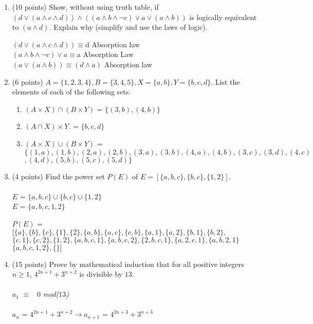 \documentclass[12pt,fleqn]{article}
\begin{document}
\begin{enumerate}
\item (10 points) Show, without using truth table, if $(d \vee (a \wedge c \wedge d)) \wedge ((a \wedge b \wedge \neg c) \vee a \vee (a \wedge b))$ is logically equivalent to $(a \wedge d)$. Explain why (simplify and use the laws of logic).

$(d \vee (a \wedge c \wedge d)) \equiv $d  Absorption law \\
$(a \wedge b \wedge \neg c) \vee a \equiv $a Absorption Law \\
$(a \vee (a \wedge b)) \equiv (d \wedge a)$ Absorption law

\item (6 points) $A = \{1, 2, 3, 4 \}, B = \{3, 4, 5\}, X = \{a, b\}, Y = \{b, c, d\}$. List the elements of each of the following sets. 
\begin{enumerate}
\item \space $(A \times X) \cap (B \times Y )$ = $\{(3,b),(4,b)\}$
\item \space $(A \cap  X) \times Y$. = $\{b,c,d\}$
\item \space $(A \times X) \cup (B \times Y )$ = $\{(1,a),(1,b),(2,a),(2,b),(3,a),(3,b),(4,a),(4,b),(3,c),(3,d),(4,c)$\\$,(4,d),(5,b),(5,c),(5,d)\}$
\end{enumerate}

\item (4 points) Find the power set $P(E)$ of $E = [\{a,b,c\},\{b,c\},\{1,2\}]$.\\ \\ $E$ = $\{a,b,c\} \cup \{b,c\} \cup \{1,2\}$ \\
$E$ = $\{a,b,c,1,2\}$

$P(E)$ = $[\{a\},\{b\},\{c\},\{1\},\{2\},\{a,b\},\{a,c\},\{c,b\},\{a,1\},\{a,2\},\{b,1\},\{b,2\},$\\
$\{c,1\},\{c,2\},\{1,2\},\{a,b,c,1\},\{a,b,c,2\},\{2,b,c,1\},\{a,2,c,1\},\{a,b,2,1\}$\\$\{a,b,c,1,2\},\{ \}]$

	     



\item (15 points) Prove by mathematical induction that for all positive integers $n \ge 1$, $ 4^{2n+1} + 3^{n+2}$ is divisible by $13$.\\\\
$a_{1}$ $\equiv$ \ $0 $ \textit{mod($13$)}\\\\
$a_{n}$ = $ 4^{2n+1} + 3^{n+2} \rightarrow a_{n+1}$ = $ 4^{2n+3} + 3^{n+3}$


\end{enumerate}
\end{document}
